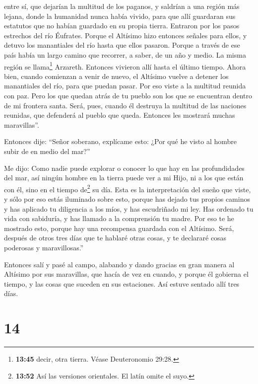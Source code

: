 entre sí, que dejarían la multitud de los paganos, y saldrían a una
región más lejana, donde la humanidad nunca había vivido,
 para que allí guardaran sus estatutos que no habían
guardado en su propia tierra.  Entraron por los pasos
estrechos del río Éufrates.  Porque el Altísimo hizo
entonces señales para ellos, y detuvo los manantiales del río hasta que
ellos pasaron.  Porque a través de ese país había un
largo camino que recorrer, a saber, de un año y medio. La misma región
se llama\footnote{\textbf{13:45} decir, otra tierra. Véase Deuteronomio
  29:28.} Arzareth.  Entonces vivieron allí hasta el
último tiempo. Ahora bien, cuando comienzan a venir de nuevo,
 el Altísimo vuelve a detener los manantiales del río,
para que puedan pasar. Por eso viste a la multitud reunida con paz.
 Pero los que quedan atrás de tu pueblo son los que se
encuentran dentro de mi frontera santa.  Será, pues,
cuando él destruya la multitud de las naciones reunidas, que defenderá
al pueblo que queda.  Entonces les mostrará muchas
maravillas''.

 Entonces dije: ``Señor soberano, explícame esto: ¿Por
qué he visto al hombre subir de en medio del mar?''

 Me dijo: Como nadie puede explorar o conocer lo que hay
en las profundidades del mar, así ningún hombre en la tierra puede ver a
mi Hijo, ni a los que están con él, sino en el tiempo de\footnote{\textbf{13:52}
  Así las versiones orientales. El latín omite el suyo.} su día.
 Esta es la interpretación del sueño que viste, y sólo
por eso estás iluminado sobre esto,  porque has dejado
tus propios caminos y has aplicado tu diligencia a los míos, y has
escudriñado mi ley.  Has ordenado tu vida con sabiduría,
y has llamado a la comprensión tu madre.  Por eso te he
mostrado esto, porque hay una recompensa guardada con el Altísimo. Será,
después de otros tres días que te hablaré otras cosas, y te declararé
cosas poderosas y maravillosas.''

 Entonces salí y pasé al campo, alabando y dando gracias
en gran manera al Altísimo por sus maravillas, que hacía de vez en
cuando,  y porque él gobierna el tiempo, y las cosas que
suceden en sus estaciones. Así estuve sentado allí tres días.

\hypertarget{section-13}{%
\section{14}\label{section-13}}

